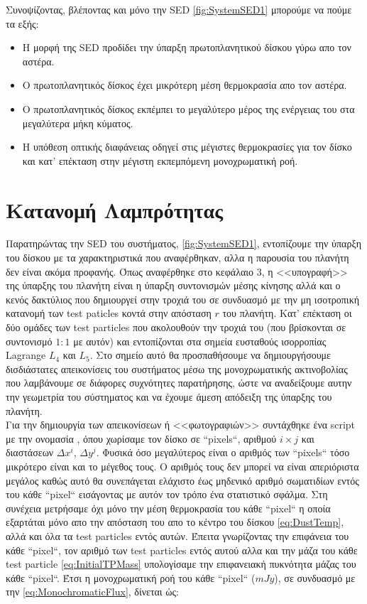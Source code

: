 Συνοψίζοντας, βλέποντας και μόνο την {\en SED} \ref{fig:SystemSED1} μπορούμε να πούμε τα εξής:

\begin{itemize}

\item Η μορφή της {\en SED} προδίδει την ύπαρξη πρωτοπλανητικού δίσκου γύρω απο τον αστέρα.
\item O πρωτοπλανητικός δίσκος έχει μικρότερη μέση θερμοκρασία απο τον αστέρα.
\item O πρωτοπλανητικός δίσκος εκπέμπει το μεγαλύτερο μέρος της ενέργειας του στα μεγαλύτερα μήκη κύματος.
\item Η υπόθεση οπτικής διαφάνειας οδηγεί στις μέγιστες θερμοκρασίες για τον δίσκο και κατ' επέκταση στην μέγιστη εκπεμπόμενη μονοχρωματική ροή.
\end{itemize}
\newpage


\section{Κατανομή Λαμπρότητας}

Παρατηρώντας την {\en SED} του συστήματος, \ref{fig:SystemSED1}, εντοπίζουμε την ύπαρξη του δίσκου με τα χαρακτηριστικά που αναφέρθηκαν, αλλα η παρουσία του πλανήτη δεν είναι ακόμα προφανής. Όπως αναφέρθηκε στο κεφάλαιο 3, η <<υπογραφή>> της ύπαρξης του πλανήτη είναι η ύπαρξη συντονισμών μέσης κίνησης αλλά και ο κενός δακτύλιος που δημιουργεί στην τροχιά του σε συνδυασμό με την μη ισοτροπική κατανομή των {\en test paticles} κοντά στην απόσταση $r$ του πλανήτη. Κατ' επέκταση οι δύο ομάδες των {\en test particles} που ακολουθούν την τροχιά του (που βρίσκονται σε συντονισμό $1:1$ με αυτόν) και εντοπίζονται στα {σημεία ευσταθούς ισορροπίας {\en Lagrange}} $L_4$ και $L_5$. Στο σημείο αυτό θα προσπαθήσουμε να δημιουργήσουμε δισδιάστατες απεικονίσεις του συστήματος μέσω  της μονοχρωματικής ακτινοβολίας που λαμβάνουμε σε διάφορες συχνότητες παρατήρησης, ώστε να αναδείξουμε αυτην την γεωμετρία του σύστηματος και να έχουμε άμεση απόδειξη της ύπαρξης του πλανήτη.\\

Για την δημιουργία των απεικονίσεων ή <<φωτογραφιών>> συντάχθηκε ένα {\en script} με την ονομασία {}, όπου χωρίσαμε τον δίσκο σε {\en ``pixels``}, αριθμού $i \times j$ και διαστάσεων $\Delta x^i$, $\Delta y^j$. Φυσικά όσο μεγαλύτερος είναι ο αριθμός των {\en ``pixels``} τόσο μικρότερο είναι και το μέγεθος τους. Ο αριθμός τους δεν μπορεί να είναι απεριόριστα μεγάλος καθώς αυτό θα συνεπάγεται ελάχιστο έως μηδενικό αριθμό σωματιδίων εντός του κάθε {\en ``pixel``} εισάγοντας με αυτόν τον τρόπο ένα στατιστικό σφάλμα. Στη συνέχεια μετρήσαμε όχι μόνο την μέση θερμοκρασία του κάθε {\en ``pixel``} η οποία εξαρτάται μόνο απο την απόσταση του απο το κέντρο του δίσκου \eqref{eq:DustTemp}, αλλά και όλα τα {\en test particles} εντός αυτών. Έπειτα γνωρίζοντας την επιφάνεια του κάθε {\en ``pixel``}, τον αριθμό των {\en test particles} εντός αυτού αλλα και την μάζα του κάθε {\en test particle} \eqref{eq:InitialTPMass} υπολογίσαμε την επιφανειακή πυκνότητα μάζας του κάθε {\en ``pixel``}. Έτσι η μονοχρωματική ροή του κάθε {\en ``pixel``} ($mJy$), σε συνδυασμό με την \eqref{eq:MonochromaticFlux}, δίνεται ώς:

